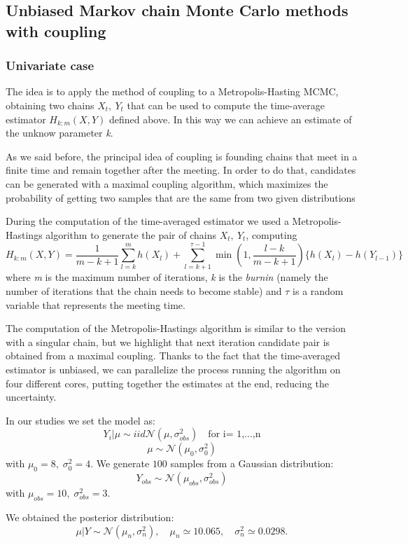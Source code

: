\documentclass {article}
\begin{document}
\subsection{Unbiased Markov chain Monte Carlo methods with coupling}

\subsubsection{Univariate case}

The idea is to apply the method of coupling to a Metropolis-Hasting MCMC, obtaining two chains ${X_t}, \: {Y_t}$ that can be used to compute the time-average estimator $H_{k:m}(X,Y)$ defined above. In this way we can achieve an estimate of the unknow parameter \emph{k}.

As we said before, the principal idea of coupling is founding chains that meet in a finite time and remain together after the meeting. In order to do that, candidates can be generated with a maximal coupling algorithm, which maximizes the probability of getting two samples that are the same from two given distributions

During the computation of the time-averaged estimator we used  a Metropolis-Hastings algorithm to generate the pair of chains ${X_t}, \: {Y_t}$, computing 
$$ H_{k:m}(X,Y)
= \frac{1}{m-k+1}\sum_{l=k}^{m}h(X_l) 
+ \sum_{l=k+1}^{\tau -1}\min(1, \frac{l-k}{m-k+1})\{h(X_l)-h(Y_{l-1})\} 
$$
where \emph{m} is the maximum number of iterations, \emph{k} is the \emph{burnin} (namely the number of iterations that the chain needs to become stable) and $\tau$ is a random variable that represents the meeting time.

The computation of the Metropolis-Hastings algorithm is similar to the version with a singular chain, but we highlight that next iteration candidate pair is obtained from a maximal coupling.
Thanks to the fact that the time-averaged estimator is unbiased, we can parallelize the process running the algorithm on four different cores, putting together the estimates at the end, reducing the uncertainty. 

In our studies we set the model as:
$$ Y_i | \mu \sim{iid} \mathcal{N}(\mu, \sigma_{obs} ^2) \quad \text{for i= 1,...,n} $$
$$ \mu  \sim \mathcal{N}(\mu_0, \sigma_0^2)$$
with $\mu_0 = 8, \; \sigma^2_0 = 4$.
We generate $100$ samples from a Gaussian distribution:
$$
Y_{obs} \sim \mathcal{N}(\mu_{obs}, \sigma_{obs} ^2)
$$
with
$
\mu_{obs} = 10, \;
\sigma_{obs} ^2 = 3
$.

We obtained the posterior distribution:
$$  
	\mu | Y \sim \mathcal{N}(\mu_n, \sigma^2_n), 
	\quad \mu_n  \simeq 10.065,
	\quad \sigma^2_n \simeq 0.0298.
$$
\end{document}

